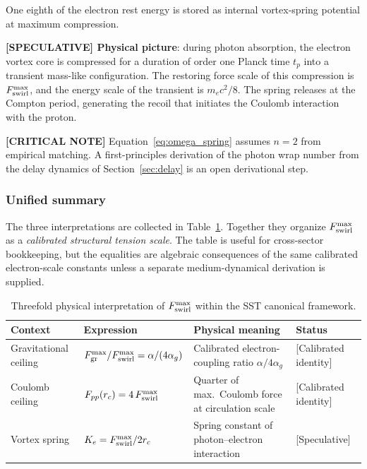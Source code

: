 \documentclass[11pt]{article}
\theoremstyle{definition}
\theoremstyle{plain}
\theoremstyle{remark}
\newcommand{\rc}{{r_c}}
\begin{document}
        One eighth of the electron rest energy is stored as internal vortex-spring potential at maximum compression.

        \textbf{[SPECULATIVE] Physical picture}: during photon absorption, the electron vortex core is compressed for a duration of order one Planck time $t_p$ into a transient mass-like configuration. The restoring force scale of this compression is $F_{\rm swirl}^{\max}$, and the energy scale of the transient is $m_e c^2/8$. The spring releases at the Compton period, generating the recoil that initiates the Coulomb interaction with the proton.

        \textbf{[CRITICAL NOTE]} Equation~\eqref{eq:omega_spring} assumes $n=2$ from empirical matching. A first-principles derivation of the photon wrap number from the delay dynamics of Section~\ref{sec:delay} is an open derivational step.

        \subsubsection{Unified summary}

        The three interpretations are collected in Table~\ref{tab:Fmax_triple}. Together they organize $F_{\rm swirl}^{\max}$ as a \emph{calibrated structural tension scale}. The table is useful for cross-sector bookkeeping, but the equalities are algebraic consequences of the same calibrated electron-scale constants unless a separate medium-dynamical derivation is supplied.

        \begin{table}[h]
        \centering
        \caption{Threefold physical interpretation of $F_{\rm swirl}^{\max}$ within the SST canonical framework.}
        \label{tab:Fmax_triple}
        \begin{tabular}{p{3.2cm}p{5.0cm}p{4.8cm}l}
        \hline
        \textbf{Context} & \textbf{Expression} & \textbf{Physical meaning} & \textbf{Status} \\
        \hline
        Gravitational ceiling &
          $F_{\rm gr}^{\max}/F_{\rm swirl}^{\max} = \alpha/(4\alpha_g)$ &
          Calibrated electron-coupling ratio $\alpha/4\alpha_g$ &
          {[Calibrated identity]} \\[6pt]
        Coulomb ceiling &
          $F_{pp}(\rc) = 4\,F_{\rm swirl}^{\max}$ &
          Quarter of max.\ Coulomb force at circulation scale &
          {[Calibrated identity]} \\[6pt]
        Vortex spring &
          $K_e = F_{\rm swirl}^{\max}/2\rc$ &
          Spring constant of photon--electron interaction &
          {[Speculative]} \\
        \hline
        \end{tabular}
        \end{table}
\end{document}
